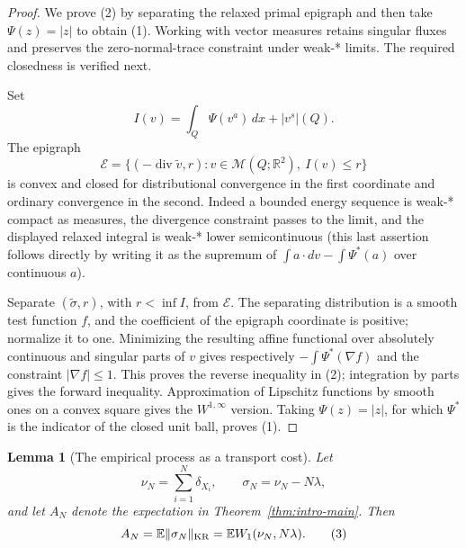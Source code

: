 \documentclass{smfart}
\newtheorem{lemma}[theorem]{Lemma}
\theoremstyle{definition}
\newcommand{\1}{\mathbf 1}
\begin{document}
\begin{proof}
We prove (2) by separating the relaxed primal epigraph and then take
$\Psi(z)=|z|$ to obtain (1).  Working with vector measures retains
singular fluxes and preserves the zero-normal-trace constraint under
weak-* limits.  The required closedness is verified next.

Set
\begin{equation*}
I(v)=\int_ Q\Psi(v^a)\,dx+|v^s|(Q).
\end{equation*}
The epigraph
\begin{equation*}
\mathscr E=\{(-\operatorname {div}\widetilde v,r):
v\in\mathcal M(Q;\mathbb R^2),\ I(v)\leq r\}
\end{equation*}
is convex and closed for distributional convergence in the first
coordinate and ordinary convergence in the second.  Indeed a bounded
energy sequence is weak-* compact as measures, the divergence constraint
passes to the limit, and the displayed relaxed integral is weak-* lower
semicontinuous (this last assertion follows directly by writing it as
the supremum of $\int a\cdot dv-\int\Psi^*(a)$ over continuous
$a$).

Separate $(\widetilde\sigma,r)$, with $r<\inf I$, from
$\mathscr E$.  The separating distribution is a smooth test function
$f$, and the coefficient of the epigraph coordinate is positive;
normalize it to one.  Minimizing the resulting affine functional over
absolutely continuous and singular parts of $v$ gives respectively
$-\int\Psi^*(\nabla f)$ and the constraint $|\nabla f|\leq1$.
This proves the reverse inequality in (2); integration by parts gives
the forward inequality.  Approximation of Lipschitz functions by smooth
ones on a convex square gives the $W^{1,\infty}$ version.  Taking
$\Psi(z)=|z|$, for which $\Psi^*$ is the indicator of the closed unit
ball, proves (1).

\end{proof}

\begin{lemma}[The empirical process as a transport cost]\label{lem:empirical-transport}
Let
\begin{equation*}
\nu_ N=\sum_ {i=1}^N\delta_ {X_ i},\qquad \sigma_ N=\nu_ N-N\lambda,
\end{equation*}
and let $A_ N$ denote the expectation in Theorem~\ref{thm:intro-main}. Then
\begin{equation}
A_ N=\mathbb E\|\sigma_ N\|_ {\rm KR}
=\mathbb E W_ 1(\nu_ N,N\lambda).
\tag{3}
\end{equation}

\end{lemma}
\end{document}
